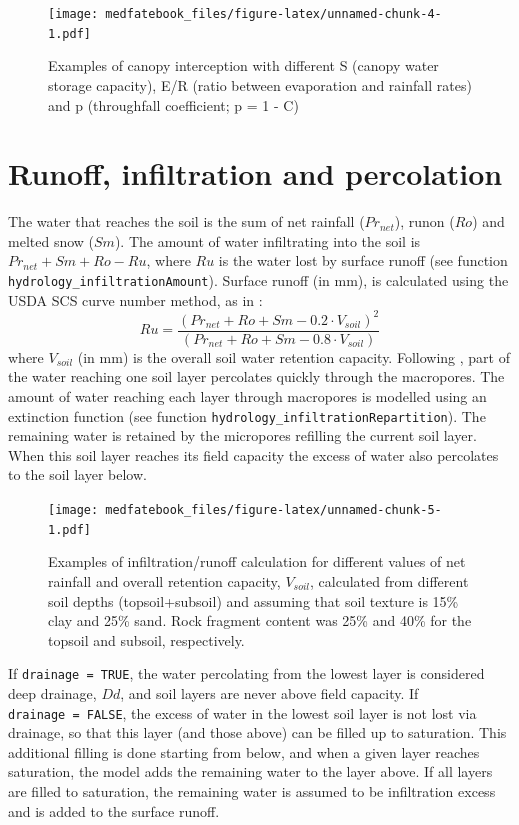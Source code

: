 \documentclass[]{book}
\begin{document}
\begin{figure}
\centering
\texttt{[image: medfatebook\_files/figure-latex/unnamed-chunk-4-1.pdf]}
\caption{\label{fig:unnamed-chunk-4}Examples of canopy interception with different S (canopy water storage capacity), E/R (ratio between evaporation and rainfall rates) and p (throughfall coefficient; p = 1 - C)}
\end{figure}

\hypertarget{runoff}{%
\section{Runoff, infiltration and percolation}\label{runoff}}

The water that reaches the soil is the sum of net rainfall (\(Pr_{net}\)), runon (\(Ro\)) and melted snow (\(Sm\)). The amount of water infiltrating into the soil is \(Pr_{net} + Sm + Ro - Ru\), where \(Ru\) is the water lost by surface runoff (see function \texttt{hydrology\_infiltrationAmount}). Surface runoff (in mm), is calculated using the USDA SCS curve number method, as in \citet{Boughton1989}:
\begin{equation}
Ru=\frac{(Pr_{net} + Ro + Sm - 0.2 \cdot V_{soil})^2}{(Pr_{net} + Ro + Sm - 0.8 \cdot V_{soil})}
\end{equation}
where \(V_{soil}\) (in mm) is the overall soil water retention capacity. Following \citet{Granier1999}, part of the water reaching one soil layer percolates quickly through the macropores. The amount of water reaching each layer through macropores is modelled using an extinction function (see function \texttt{hydrology\_infiltrationRepartition}). The remaining water is retained by the micropores refilling the current soil layer. When this soil layer reaches its field capacity the excess of water also percolates to the soil layer below.

\begin{figure}
\centering
\texttt{[image: medfatebook\_files/figure-latex/unnamed-chunk-5-1.pdf]}
\caption{\label{fig:unnamed-chunk-5}Examples of infiltration/runoff calculation for different values of net rainfall and overall retention capacity, \(V_{soil}\), calculated from different soil depths (topsoil+subsoil) and assuming that soil texture is 15\% clay and 25\% sand. Rock fragment content was 25\% and 40\% for the topsoil and subsoil, respectively.}
\end{figure}

If \texttt{drainage\ =\ TRUE}, the water percolating from the lowest layer is considered deep drainage, \(Dd\), and soil layers are never above field capacity. If \texttt{drainage\ =\ FALSE}, the excess of water in the lowest soil layer is not lost via drainage, so that this layer (and those above) can be filled up to saturation. This additional filling is done starting from below, and when a given layer reaches saturation, the model adds the remaining water to the layer above. If all layers are filled to saturation, the remaining water is assumed to be infiltration excess and is added to the surface runoff.
\end{document}

